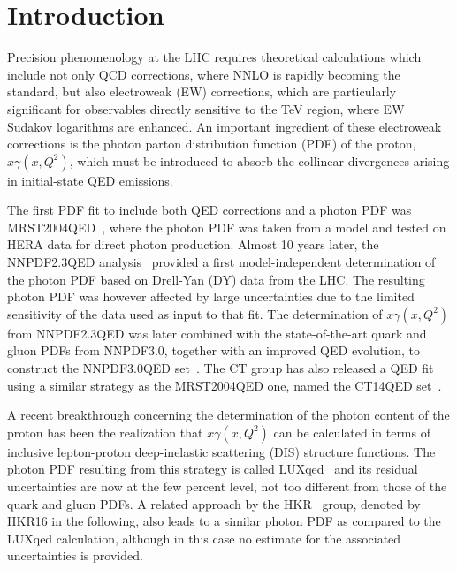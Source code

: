 \section{Introduction}

Precision phenomenology at the LHC requires theoretical calculations
which include not only QCD corrections, where NNLO is rapidly becoming
the standard, but also electroweak (EW) corrections, which are
particularly significant for observables directly sensitive to the TeV
region, where EW Sudakov logarithms are enhanced.
%
An important ingredient of these electroweak corrections is the photon
parton distribution function (PDF) of the proton, $x\gamma(x,Q^2)$, which must be introduced to absorb
the collinear divergences arising in initial-state QED emissions.

The first PDF fit to include both QED corrections and a photon PDF was MRST2004\-QED~\cite{Martin:2004dh}, where the photon PDF was taken from
a model and tested on HERA data for direct photon production.
%
Almost 10 years later, the NNPDF2.3QED analysis~\cite{Ball:2012cx,Ball:2013hta} provided a
first model-independent determination of the photon PDF based on
Drell-Yan (DY) data from the LHC.
%
The resulting photon PDF was however affected by large uncertainties
due to the limited sensitivity of the data used as input to that fit.
%
The determination of $x\gamma(x,Q^2)$ from NNPDF2.3QED was later combined
with the state-of-the-art quark and gluon
PDFs from NNPDF3.0, together with an improved QED evolution,
to construct the NNPDF3.0QED set~\cite{Bertone:2016ume,Ball:2014uwa}.
%
The CT group has also  released a QED fit using a similar
strategy as the MRST2004QED one, named the CT14QED set~\cite{Schmidt:2015zda}.

A recent breakthrough concerning the determination of the photon content of
the proton
has been the realization that  $x\gamma(x,Q^2)$
can be calculated in terms of
inclusive lepton-proton deep-inelastic scattering (DIS) structure functions.
%
The photon PDF resulting from this
strategy is called  LUXqed~\cite{Manohar:2016nzj} and its residual uncertainties are now at the few
percent level, not too different from those
of the quark and gluon PDFs.
%
A related approach by the HKR~\cite{Harland-Lang:2016kog}
group, denoted by HKR16 in the following, also leads to a similar photon PDF
as compared to the LUXqed calculation, although in this case no estimate
for the associated uncertainties is provided.

